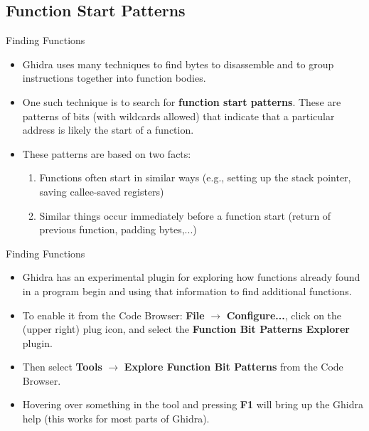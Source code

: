 \documentclass{beamer}
\begin{document}
\subsection{Function Start Patterns}

\begin{frame}
\begin{block}{Finding Functions}
\begin{itemize}
\item Ghidra uses many techniques to find bytes to disassemble and to group instructions together into function bodies.
\item One such technique is to search for \textbf{function start patterns}.  These are patterns of bits (with wildcards allowed) that indicate that a particular address is likely the
start of a function.
\item These patterns are based on two facts:
\begin{enumerate}
\item Functions often start in similar ways (e.g., setting up the stack pointer, saving callee-saved registers)
\item Similar things occur immediately before a function start (return of previous function, padding bytes,...)
\end{enumerate}
\end{itemize}
\end{block}
\end{frame}

\begin{frame}
\begin{block}{Finding Functions}
\begin{itemize}
\item Ghidra has an experimental plugin for exploring how functions already found in a program begin and using that information to find additional functions.
\item To enable it from the Code Browser: \textbf{File} $\rightarrow$ \textbf{Configure...}, click on the (upper right) plug icon, and select the
\textbf{Function Bit Patterns Explorer} plugin.
\item Then select \textbf{Tools} $\rightarrow$ \textbf{Explore Function Bit Patterns} from the Code Browser.
\item Hovering over something in the tool and pressing \textbf{F1} will bring up the Ghidra help (this works for most parts of Ghidra).
\end{itemize}
\end{block}
\end{frame}
\end{document}
